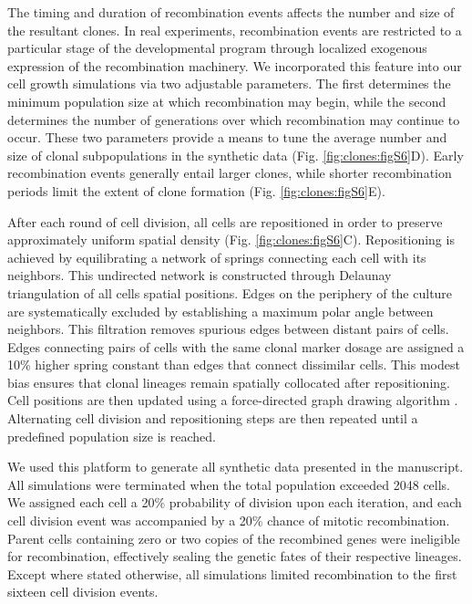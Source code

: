 The timing and duration of recombination events affects the number and size of the resultant clones. In real experiments, recombination events are restricted to a particular stage of the developmental program through localized exogenous expression of the recombination machinery. We incorporated this feature into our cell growth simulations via two adjustable parameters. The first determines the minimum population size at which recombination may begin, while the second determines the number of generations over which recombination may continue to occur. These two parameters provide a means to tune the average number and size of clonal subpopulations in the synthetic data (Fig. \ref{fig:clones:figS6}D). Early recombination events generally entail larger clones, while shorter recombination periods limit the extent of clone formation (Fig. \ref{fig:clones:figS6}E).

After each round of cell division, all cells are repositioned in order to preserve approximately uniform spatial density (Fig. \ref{fig:clones:figS6}C). Repositioning is achieved by equilibrating a network of springs connecting each cell with its neighbors. This undirected network is constructed through Delaunay triangulation of all cells spatial positions. Edges on the periphery of the culture are systematically excluded by establishing a maximum polar angle between neighbors. This filtration removes spurious edges between distant pairs of cells. Edges connecting pairs of cells with the same clonal marker dosage are assigned a 10\% higher spring constant than edges that connect dissimilar cells. This modest bias ensures that clonal lineages remain spatially collocated after repositioning. Cell positions are then updated using a force-directed graph drawing algorithm \cite{Kamada1989}. Alternating cell division and repositioning steps are then repeated until a predefined population size is reached.

We used this platform to generate all synthetic data presented in the manuscript. All simulations were terminated when the total population exceeded 2048 cells. We assigned each cell a 20\% probability of division upon each iteration, and each cell division event was accompanied by a 20\% chance of mitotic recombination. Parent cells containing zero or two copies of the recombined genes were ineligible for recombination, effectively sealing the genetic fates of their respective lineages. Except where stated otherwise, all simulations limited recombination to the first sixteen cell division events.

